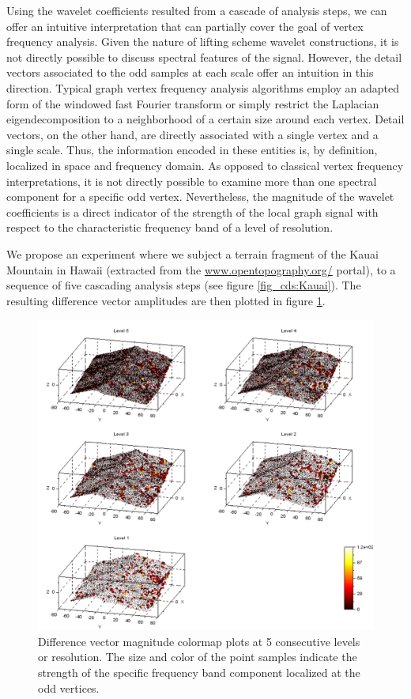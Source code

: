 \documentclass[graybox]{svmult}
\begin{document}
Using the wavelet coefficients resulted from a cascade of analysis steps, we can offer an intuitive interpretation that can partially cover the goal of vertex frequency analysis.
Given the nature of lifting scheme wavelet constructions, it is not directly possible to discuss spectral features of the signal. However, the detail vectors associated to the odd samples at each scale offer an intuition in this direction. 
Typical graph vertex frequency analysis algorithms employ an adapted form of the windowed fast Fourier transform or simply restrict the Laplacian eigendecomposition to a neighborhood of a certain size around each vertex. Detail vectors, on the other hand, are directly associated with a single vertex and a single scale. Thus, the information encoded in these entities is, by definition, localized in space and frequency domain. As opposed to classical vertex frequency interpretations, it is not directly possible to examine more than one spectral component for a specific odd vertex. Nevertheless, the magnitude of the wavelet coefficients is a direct indicator of the strength of the local graph signal with respect to the characteristic frequency band of a level of resolution.

We propose an experiment where we subject a terrain fragment of the Kauai Mountain in Hawaii  (extracted from the {\url{www.opentopography.org/}} portal), to a sequence of five cascading analysis steps (see figure  \ref{fig_cds:Kauai}). The resulting difference vector amplitudes are then plotted in figure \ref{fig_cds:diff_vector_5}.

\begin{figure}[!htbp]
	\centering
	\includegraphics[width=1\linewidth]{diff5VectorVFA.pdf}
	\caption{\label{fig_cds:diff_vector_5}
		Difference vector magnitude colormap plots at 5 consecutive levels or resolution. The size and color of the point samples indicate the strength of the specific frequency band component localized at the odd vertices. }
\end{figure}
\end{document}
